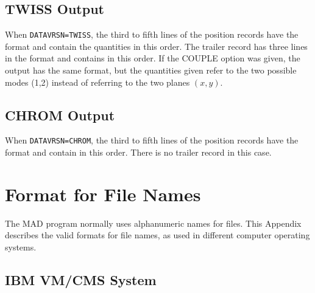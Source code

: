 \section{TWISS Output}
When {\tt DATAVRSN=TWISS},
the third to fifth lines of the position records have the format
and contain the quantities
in this order.
The trailer record has three lines in the format
and contains
in this order.
If the COUPLE option was given, the output has the same format,
but the quantities given refer to the two possible modes (1,2) instead
of referring to the two planes \((x,y)\).

\section{CHROM Output}
When {\tt DATAVRSN=CHROM},
the third to fifth lines of the position records have the format
and contain
in this order.
There is no trailer record in this case.

\chapter{Format for File Names}
\label{A-FILES}
The MAD program normally uses alphanumeric names for files.
This Appendix describes the valid formats for file names,
as used in different computer operating systems.
\section{IBM VM/CMS System}
\label{S-IBM}
